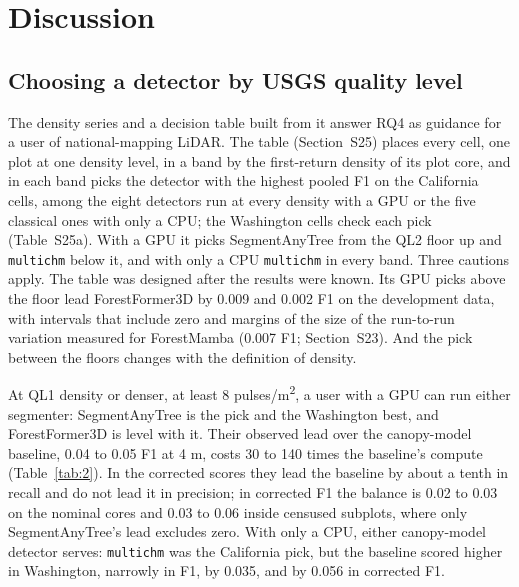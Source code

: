 \documentclass[preprint,12pt,authoryear,a4paper]{elsarticle}
\begin{document}
\section{Discussion}\label{sec:6}

\subsection{Choosing a detector by USGS quality level}\label{sec:6.1}

The density series and a decision table built from it answer RQ4 as guidance
for a user of national-mapping LiDAR. The table (Section~S25) places every cell,
one plot at one density level, in a band by the first-return density of its plot
core, and in each band picks the detector with the highest pooled F1 on the
California cells, among the eight detectors run at every density with a GPU or
the five classical ones with only a CPU; the Washington cells check each pick
(Table~S25a). With a GPU it picks SegmentAnyTree from the QL2 floor up and
\texttt{multichm} below it, and with only a CPU \texttt{multichm} in every band. Three
cautions apply. The table was designed after the results were known. Its GPU
picks above the floor lead ForestFormer3D by 0.009 and 0.002 F1 on the
development data, with intervals that include zero and margins of the size of
the run-to-run variation measured for ForestMamba (0.007 F1; Section~S23). And
the pick between the floors changes with the definition of density.

At QL1 density or denser, at least 8 pulses/m\textsuperscript{2}, a user with a GPU can run either
segmenter: SegmentAnyTree is the pick and the Washington best, and
ForestFormer3D is level with it. Their observed lead over the canopy-model
baseline, 0.04 to 0.05 F1 at 4 m, costs 30 to 140 times the baseline's compute
(Table~\ref{tab:2}). In the corrected scores they lead the baseline by about a tenth in
recall and do not lead it in precision; in corrected F1 the balance is 0.02 to
0.03 on the nominal cores and 0.03 to 0.06 inside censused subplots, where only
SegmentAnyTree's lead excludes zero. With only a CPU, either canopy-model
detector serves: \texttt{multichm} was the California pick, but the baseline scored
higher in Washington, narrowly in F1, by 0.035, and by 0.056 in corrected F1.
\end{document}
